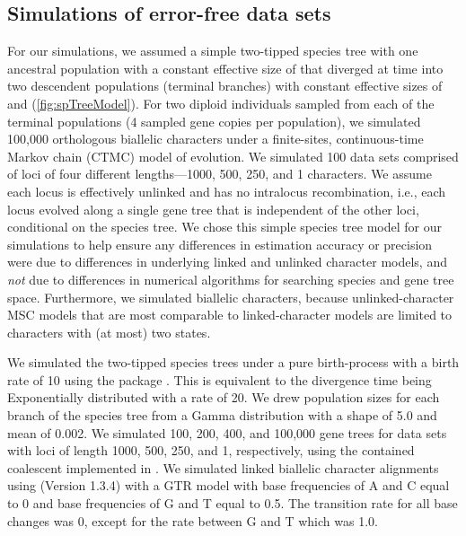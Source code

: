 \subsection{Simulations of error-free data sets}
For our simulations, we assumed a simple two-tipped species tree with one 
ancestral population with a constant effective size of \rootpopsize that 
diverged at time \divtime into two descendent populations (terminal branches) 
with constant effective sizes of \tippopsize[1] and \tippopsize[2] (\cref{fig:spTreeModel}).
For two diploid individuals sampled from each of the terminal
populations (4 sampled gene copies per population),
we simulated 100,000 orthologous biallelic characters under a finite-sites,
continuous-time Markov chain (CTMC) model of evolution.
We simulated 100 data sets comprised of loci of four different lengths---1000,
500, 250, and 1 characters.
We assume each locus is effectively unlinked and has no intralocus
recombination, i.e., each locus evolved along a single gene tree that is
independent of the other loci, conditional on the species tree.
We chose this simple species tree model for our simulations to help ensure any
differences in estimation accuracy or precision were due to differences in
underlying linked and unlinked character models,
and \emph{not} due to differences in numerical algorithms for searching species
and gene tree space.
Furthermore, we simulated biallelic characters, because unlinked-character MSC
models \citep{bryantInferringSpeciesTrees2012,Oaks2018ecoevolity}
that are most comparable to linked-character models
\citep{Heled2010,ogilvieStarBEAST2BringsFaster2017}
are limited to characters with (at most) two states.

We simulated the two-tipped species trees under a pure birth-process with a
birth rate of 10 using the \python package \dendropy
\citep[Version 4.40, Commit eb69003;][]{Dendropy}.
This is equivalent to the divergence time being Exponentially distributed with
a rate of 20.
We drew population sizes for each branch of the species tree from a Gamma 
distribution with a shape of 5.0 and mean of 0.002.
We simulated 100, 200, 400, and 100,000 gene trees for data sets with loci of
length 1000, 500, 250, and 1, respectively, using the contained coalescent
implemented in \dendropy.
We simulated linked biallelic character alignments using
\seqgen (Version 1.3.4)
\citep{rambautSeqGenApplicationMonte1997}
with a GTR model with base frequencies of A and C equal to 0 and base 
frequencies of G and T equal to 0.5. The transition rate for all base changes was 
0, except for the rate between G and T which was 1.0. 

